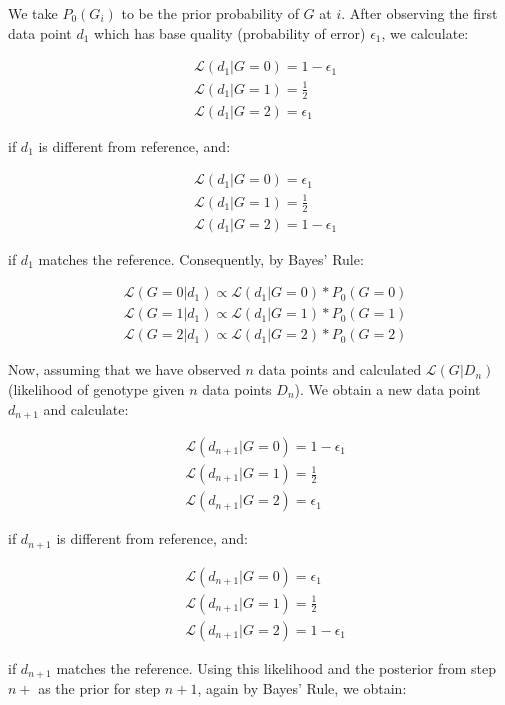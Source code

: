 We take $P_0(G_i)$ to be the prior probability of $G$ at $i$. After observing the first data point $d_1$ which has base quality (probability of error) $\epsilon_1$, we calculate:

\begin{align*}
&\mathcal{L}(d_1|G=0) = 1 - \epsilon_1\\
&\mathcal{L}(d_1|G=1) = \frac{1}{2}\\
&\mathcal{L}(d_1|G=2) = \epsilon_1
\end{align*}

if $d_1$ is different from reference, and:

\begin{align*}
&\mathcal{L}(d_1|G=0) = \epsilon_1\\
&\mathcal{L}(d_1|G=1) = \frac{1}{2}\\
&\mathcal{L}(d_1|G=2) = 1 - \epsilon_1
\end{align*}

if $d_1$ matches the reference. Consequently, by Bayes' Rule:

\begin{align*}
&\mathcal{L}(G=0|d_1) \propto \mathcal{L}(d_1|G=0) * P_0(G=0)\\
&\mathcal{L}(G=1|d_1) \propto \mathcal{L}(d_1|G=1) * P_0(G=1)\\
&\mathcal{L}(G=2|d_1) \propto \mathcal{L}(d_1|G=2) *  P_0(G=2)
\end{align*}

Now, assuming that we have observed $n$ data points and calculated $\mathcal{L}(G|D_n)$ (likelihood of genotype given $n$ data points $D_n$). We obtain a new data point $d_{n+1}$ and calculate:

\begin{align*}
&\mathcal{L}(d_{n+1}|G=0) = 1 - \epsilon_1\\
&\mathcal{L}(d_{n+1}|G=1) = \frac{1}{2}\\
&\mathcal{L}(d_{n+1}|G=2) = \epsilon_1
\end{align*}

if $d_{n+1}$ is different from reference, and:

\begin{align*}
&\mathcal{L}(d_{n+1}|G=0) = \epsilon_1\\
&\mathcal{L}(d_{n+1}|G=1) = \frac{1}{2}\\
&\mathcal{L}(d_{n+1}|G=2) = 1 - \epsilon_1
\end{align*}

if $d_{n+1}$ matches the reference. Using this likelihood and the posterior from step $n+$ as the prior for step $n+1$, again by Bayes' Rule, we obtain:


